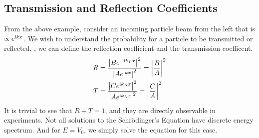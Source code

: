 \subsection{Transmission and Reflection Coefficients}
From the above example, consider an incoming particle beam from the left that is $\propto e^{\mathrm{i} k x}$. We wish to understand the probability for a particle to be transmitted or reflected. , we can define the reflection coefficient and the transmission coefficent.
\begin{align*}
    R &= \frac{\abs{Be^{-\mathrm{i} k_L x}}^2}{\abs{Ae^{\mathrm{i} k x}}^2} = \abs{\frac{B}{A}}^2 \\
    T &= \frac{\abs{Ce^{\mathrm{i} k_R x}}^2}{\abs{Ae^{\mathrm{i} k_L x}}^2} = \abs{\frac{C}{A}}^2
\end{align*}
It is trivial to see that $R + T = 1$, and they are directly observable in experiments. Not all solutions to the Schr\"odinger's Equation have discrete energy spectrum. And for $E = V_0$, we simply solve the equation for this case.

